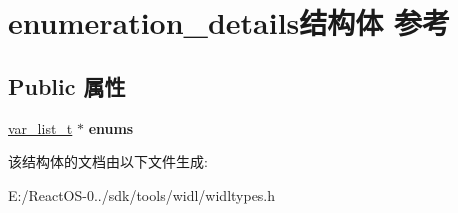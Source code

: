 \hypertarget{structenumeration__details}{}\section{enumeration\+\_\+details结构体 参考}
\label{structenumeration__details}
\subsection*{Public 属性}
\begin{DoxyCompactItemize}
\item 
\mbox{\label{structenumeration__details_a56b5024d148e1d2e1ff113d9f5c9f87d}} 
\hyperlink{classlist}{var\+\_\+list\+\_\+t} $\ast$ {\bfseries enums}
\end{DoxyCompactItemize}


该结构体的文档由以下文件生成\+:\begin{DoxyCompactItemize}
\item 
E\+:/\+React\+O\+S-\/0../sdk/tools/widl/widltypes.\+h\end{DoxyCompactItemize}
